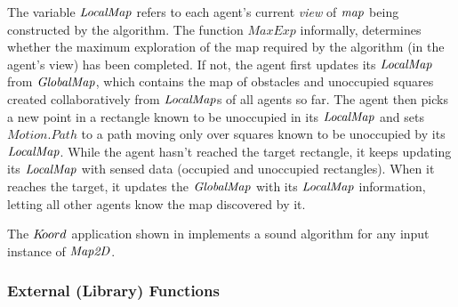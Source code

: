 The variable $\mathit{LocalMap}$ refers to each agent's current \emph{view} of $\mathit{map}$ being constructed by the algorithm. The function $\mathit{MaxExp}$ informally, determines whether the maximum exploration of the map required by the algorithm (in the agent's view) has been completed. If not, the agent first updates its $\mathit{LocalMap}$ from $\mathit{GlobalMap}$, which contains the map of obstacles and unoccupied squares created collaboratively from $\mathit{LocalMap}$s of all agents so far. The agent then picks a new point in a rectangle known to be unoccupied in its $\mathit{LocalMap}$ and sets $\mathit{Motion.Path}$ to a path moving only over squares known to be unoccupied by its $\mathit{LocalMap}$. While the agent hasn't reached the target rectangle, it keeps updating its $\mathit{LocalMap}$ with sensed data (occupied and unoccupied rectangles). When it reaches the target, it updates the $\mathit{GlobalMap}$ with its $\mathit{LocalMap}$ information, letting all other agents know the map discovered by it.



\begin{theorem}
    The $K\kern-2pt oord$ application shown in  implements a sound algorithm for any input instance of $\mathit{Map2D}$.
\end{theorem}

\subsubsection{External (Library) Functions}

